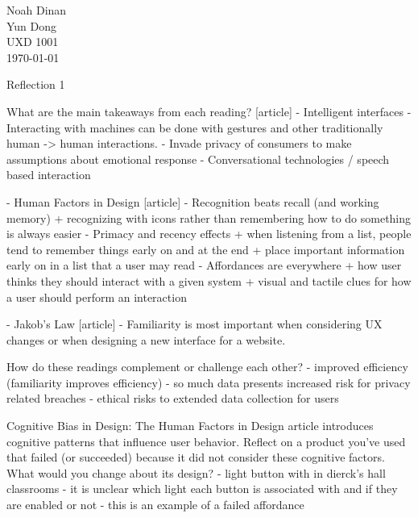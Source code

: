 \documentclass[12pt]{article}
\begin{document}

\newpage
\noindent
Noah Dinan \\ Yun Dong \\ UXD 1001 \\ \today \\

\begin{center}
Reflection 1
\end{center}

\setlength{\parindent}{0.5in}

    What are the main takeaways from each reading? [article]
     - Intelligent interfaces
        - Interacting with machines can be done with gestures and other traditionally human -> human interactions.
        - Invade privacy of consumers to make assumptions about emotional response
        - Conversational technologies / speech based interaction

     - Human Factors in Design [article]
        - Recognition beats recall (and working memory)
            + recognizing with icons rather than remembering how to do something is always easier
        - Primacy and recency effects
            + when listening from a list, people tend to remember things early on and at the end
            + place important information early on in a list that a user may read
        - Affordances are everywhere
            + how user thinks they should interact with a given system 
            + visual and tactile clues for how a user should perform an interaction

    - Jakob's Law [article]
        - Familiarity is most important when considering UX changes or
          when designing a new interface for a website.

    How do these readings complement or challenge each other?
     - improved efficiency (familiarity improves efficiency)
     - so much data presents increased risk for privacy related breaches
     - ethical risks to extended data collection for users

    Cognitive Bias in Design: The Human Factors in Design article introduces cognitive patterns that influence user behavior.
    Reflect on a product you’ve used that failed (or succeeded) because it did not consider these cognitive factors. What would you change about its design?
        - light button with in dierck's hall classrooms
        - it is unclear which light each button is associated with and if they are enabled or not
        - this is an example of a failed affordance
\end{document}

